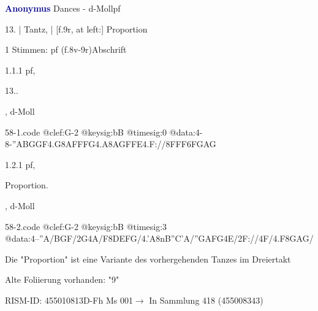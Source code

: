 \documentclass[twocolumn]{book}
\begin{document}
\par \vspace{7pt} \textcolor{darkblue}{\textbf{Anonymus  }}\hfillplus{\textbf{[58]}}\newline Dances - d-Moll\newline pf
\par \begin{itshape}[f.8v, at left:] 13. | Tantz, | [f.9r, at left:] Proportion\end{itshape} 
\par \textcolor{darkblue}{}  1 Stimmen: pf  (f.8v-9r)\newline Abschrift
\par 1.1.1  pf, \begin{itshape}13..\end{itshape}, d-Moll  
\begin{filecontents*}{58-1.code}
@clef:G-2
@keysig:bB
@timesig:0
@data:4-8-''A{BGGF}4.G8A{FFFG}4.A8A{GFFE}4.F://8F{FF}{6FGAG}
\end{filecontents*}
\newline
%
\par 1.2.1  pf, \begin{itshape}Proportion.\end{itshape}, d-Moll  
\begin{filecontents*}{58-2.code}
@clef:G-2
@keysig:bB
@timesig:3
@data:4--''A/BGF/2G4A/F{8DEFG}/4.'A{8nB''C'A}/{''GAFG}4E/2F://4F/4.F{8GAG}/
\end{filecontents*}
\newline
%
\par Die "Proportion" ist eine Variante des vorhergehenden Tanzes im Dreiertakt
\par Alte Foliierung vorhanden: "9"
\par RISM-ID: 455010813\newline D-Fh  Ms 001\newline $\rightarrow$ In Sammlung 418 (455008343)
      
\end{document}
